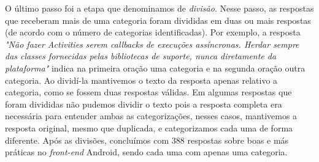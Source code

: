 \begin{table*}[t]
\begin{tabular}{p{4cm}|p{.3cm}p{.3cm}p{.3cm}p{.3cm}p{.3cm}p{.3cm}p{.3cm}p{.3cm}p{.3cm}p{.4cm}p{.4cm}p{.4cm}p{.4cm}p{.4cm}p{.4cm}p{.4cm}p{.4cm}p{.4cm}p{.4cm}}
\toprule
\end{tabular}
\label{tab:DadosDemograficos2}
\end{table*}





O \'ultimo passo foi a etapa que denominamos de \textit{divis\~ao}. Nesse passo, as respostas que receberam mais de uma categoria foram divididas em duas ou mais respostas (de acordo com o n\'umero de categorias identificadas). Por exemplo, a resposta \textit{"N\~ao fazer Activities serem callbacks de execu\c{c}\~oes ass\'incronas. Herdar sempre das classes fornecidas pelas bibliotecas de suporte, nunca diretamente da plataforma"} indica na primeira ora\c{c}\~ao uma categoria e na segunda ora\c{c}\~ao outra categoria. Ao divid\'i-la mantivemos o texto da resposta apenas relativo a categoria, como se fossem duas respostas v\'alidas. Em algumas respostas que foram divididas n\~ao pudemos dividir o texto pois a resposta completa era necess\'aria para entender ambas as categoriza\c{c}\~oes, nesses casos, mantivemos a resposta original, mesmo que duplicada, e categorizamos cada uma de forma diferente. Ap\'os as divis\~oes, conclu\'imos com 388 respostas sobre boas e m\'as pr\'aticas no \textit{front-end} Android, sendo cada uma com apenas uma categoria. 

